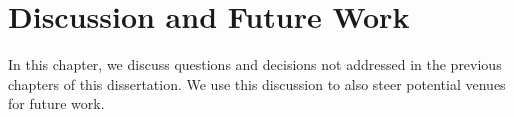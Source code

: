 \setcounter{chapter}{6}


\chapter{Discussion and Future Work}
\label{ch:discussion}


In this chapter, we discuss questions
and decisions not addressed in the previous chapters of this dissertation. 
We use this discussion to also steer  potential venues for future work.




 













